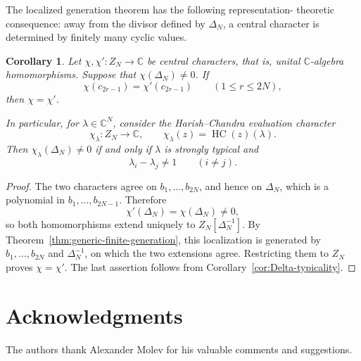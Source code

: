 \documentclass[11pt]{amsart}
\numberwithin{equation}{section}
\newtheorem{corollary}[theorem]{Corollary}
\theoremstyle{definition}
\theoremstyle{remark}
\newcommand{\C}{\mathbb C}
\newcommand{\HC}{\operatorname{HC}}
\begin{document}
The localized generation theorem has the following representation-
theoretic consequence: away from the divisor defined by \(\Delta_N\),
a central character is determined by finitely many cyclic values.

\begin{corollary}
\label{cor:generic-central-characters}
Let \(\chi,\chi'\colon Z_N\to\C\) be central characters, that is,
unital \(\C\)-algebra homomorphisms.  Suppose that
\(\chi(\Delta_N)\neq0\).  If
\[
 \chi(c_{2r-1})=\chi'(c_{2r-1})
 \qquad(1\leq r\leq2N),
\]
then \(\chi=\chi'\).

In particular, for \(\lambda\in\C^N\), consider the
Harish--Chandra evaluation character
\[
 \chi_\lambda\colon Z_N\longrightarrow\C,
 \qquad
 \chi_\lambda(z)=\HC(z)(\lambda).
\]
Then \(\chi_\lambda(\Delta_N)\neq0\) if and only if \(\lambda\) is
strongly typical and
\[
 \lambda_i-\lambda_j\neq1
 \qquad(i\neq j).
\]
\end{corollary}

\begin{proof}
The two characters agree on \(b_1,\ldots,b_{2N}\), and hence on
\(\Delta_N\), which is a polynomial in
\(b_1,\ldots,b_{2N-1}\).  Therefore
\[
 \chi'(\Delta_N)=\chi(\Delta_N)\neq0,
\]
so both homomorphisms extend uniquely to
\(Z_N[\Delta_N^{-1}]\).  By
Theorem~\ref{thm:generic-finite-generation}, this localization is
generated by \(b_1,\ldots,b_{2N}\) and \(\Delta_N^{-1}\), on which the
two extensions agree.  Restricting them to \(Z_N\) proves
\(\chi=\chi'\).  The last assertion follows from
Corollary~\ref{cor:Delta-typicality}.
\end{proof}

\section*{Acknowledgments}
The authors thank Alexander Molev for his valuable comments and
suggestions. 
\end{document}
